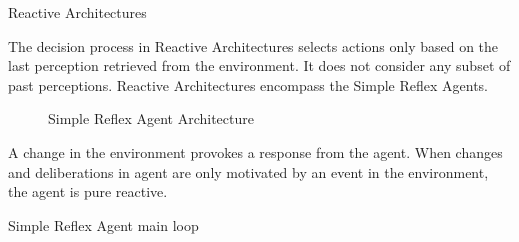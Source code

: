 \documentclass[11pt,oneside,a4paper,openright]{report}
\begin{document}
\begin{description} %
	\item Reactive Architectures

The decision process in Reactive Architectures selects actions only based on the last perception retrieved
from the environment. It does not consider any subset of past perceptions. Reactive Architectures encompass  
the Simple Reflex Agents.

		\begin{figure}[h]
		\centering
		\setlength\fboxsep{0pt}
		\setlength\fboxrule{0.5pt}
		\caption{Simple Reflex Agent Architecture}
		\label{fig:SimpleReflexArchitect0_label}
		\end{figure}

A change in the environment provokes a response from the agent. When changes and deliberations in agent are
only motivated by an event in the environment, the agent is pure reactive.\\
	
		\begin{algorithm}[h]
		\SetAlgoLined
		\BlankLine
		\caption{Simple Reflex Agent main loop}
		\end{algorithm}

	\begin{itemize}


\end{itemize}
\end{description}
\end{document}
